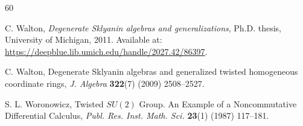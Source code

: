 \documentclass{amsart}
\theoremstyle{definition}
\theoremstyle{remark}
\numberwithin{equation}{section}
\begin{document}
\begin{thebibliography}{60}

C. Walton, \emph{Degenerate Sklyanin algebras and generalizations}, Ph.D. thesis, University of Michigan, 2011. Available at: \url{https://deepblue.lib.umich.edu/handle/2027.42/86397}.

 C. Walton, {D}egenerate \uppercase{S}klyanin algebras and generalized twisted homogeneous coordinate rings, {\em J. Algebra} {\bf 322}(7) (2009) 2508--2527.

 S. L. Woronowicz, Twisted $SU(2)$ {G}roup. An {E}xample of a {N}oncommutative {D}ifferential {C}alculus, {\em Publ. Res. Inst. Math. Sci.} {\bf 23}(1) (1987) 117--181.




\end{thebibliography}
\end{document}

